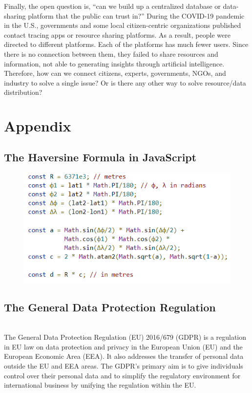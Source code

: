 \documentclass{ucsdreport}
\begin{document}
Finally, the open question is, “can we build up a centralized database or
data-sharing platform that the public can trust in?” During the COVID-19
pandemic in the U.S., governments and some local citizen-centric 
organizations published contact tracing apps or resource sharing platforms. 
As a result, people were directed to different platforms. Each of the 
platforms has much fewer users. Since there is no connection between them,
they failed to share resources and information, not able to generating insights
through artificial intelligence. Therefore, how can we connect citizens, 
experts, governments, NGOs, and industry to solve a single issue? Or is there 
any other way to solve resource/data distribution?


\newpage
\section{Appendix}
\subsection{The Haversine Formula in JavaScript}
\href{https://www.movable-type.co.uk/scripts/latlong.html}
{\color{blue}{Calculate distance, bearing and more between Latitude/Longitude points (Veness 2019)}}
\begin{figure}[H]
    \includegraphics[scale=0.85]{images/haversine.PNG}
\end{figure}

\subsection{The General Data Protection Regulation}
\href{https://en.wikipedia.org/wiki/General_Data_Protection_Regulation}
{\color{blue}{From Wikipedia:} } \\
The General Data Protection Regulation (EU) 2016/679 (GDPR) is a regulation 
in EU law on data protection and privacy in the European Union (EU) and
the European Economic Area (EEA). It also addresses the transfer of personal
data outside the EU and EEA areas. The GDPR's primary aim is to give 
individuals control over their personal data and to simplify the regulatory
environment for international business by unifying the regulation within the EU.
\end{document}
